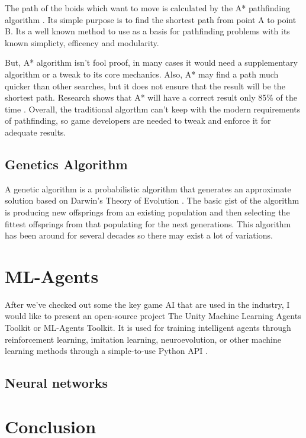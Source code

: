 \documentclass[a4paper, 12pt]{book}
\begin{document}
The path of the boids which want to move is calculated by the A* pathfinding algorithm \cite{FOEAD2021507}. Its simple purpose is to find the shortest path from point A to point B. Its a well known method to use as a basis for pathfinding problems with its known  simplicty, efficency and modularity.

But, A* algorithm isn't fool proof, in many cases it would need a supplementary algorithm or a tweak to its core mechanics. Also, A* may find a path much quicker than other searches, but it does not ensure that the result will be the shortest path. Research shows that A* will have a correct result only 85\% of the time \cite{FOEAD2021507}. Overall, the traditional algorthm can't keep with the modern requirements of pathfinding, so game developers are needed to tweak and enforce it for adequate results.


\section{Genetics Algorithm}

A genetic algorithm is a probabilistic algorithm that generates an approximate solution based on Darwin’s Theory of Evolution \cite{GameAIGeneticAlg}. The basic gist of the algorithm is producing new offsprings from an existing population and then selecting the fittest offsprings from that populating for the next generations. This algorithm has been around for several decades so there may exist a lot of variations.

\chapter{ML-Agents}
\label{ch3}

After we've checked out some the key game AI that are used in the industry, I would like to present an open-source project The Unity Machine Learning Agents Toolkit or ML-Agents Toolkit. It is used for training intelligent agents through reinforcement learning, imitation learning, neuroevolution, or other machine learning methods through a simple-to-use Python API \cite{MLAgents}.



\section{Neural networks}

\chapter{Conclusion}
\label{ch4}



\cleardoublepage
{}


\end{document}
